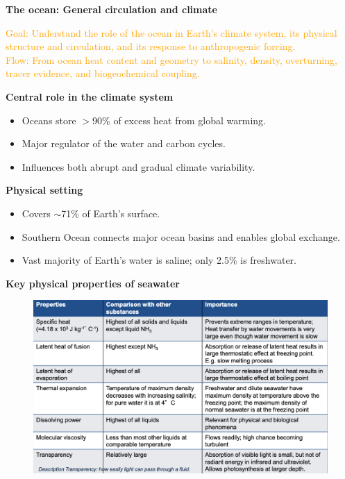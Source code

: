 \documentclass[fontsize=8pt, a4paper, landscape, fleqn]{scrartcl}
\renewcommand{\section}[1]{%
    \noindent\colorbox{sectioncolor}{%
        \parbox{\dimexpr\columnwidth-2\fboxsep}{\color{white}\textbf{#1}}}%
    \vspace{0.5mm}%
}
\renewcommand{\subsection}[1]{%
    \noindent\colorbox{subsectioncolor}{%
        \parbox{\dimexpr\columnwidth-2\fboxsep}{\color{white}\textbf{#1}}}%
    \vspace{0.5mm}%
}
\begin{document}
\begin{multicols*}{3}[\raggedcolumns]
\section{The ocean: General circulation and climate}
\noindent\textcolor{orange}{
Goal: Understand the role of the ocean in Earth's climate system, its physical structure and circulation, and its response to anthropogenic forcing.\\
Flow: From ocean heat content and geometry to salinity, density, overturning, tracer evidence, and biogeochemical coupling.
}

\subsection{Central role in the climate system}
\begin{itemize}
    \item Oceans store $>$90\% of excess heat from global warming.
    \item Major regulator of the water and carbon cycles.
    \item Influences both abrupt and gradual climate variability.
\end{itemize}

\subsection{Physical setting}
\begin{itemize}
    \item Covers $\sim$71\% of Earth's surface.
    \item Southern Ocean connects major ocean basins and enables global exchange.
    \item Vast majority of Earth’s water is saline; only 2.5\% is freshwater.
\end{itemize}

\subsection{Key physical properties of seawater}

\begin{figure}[H]
    \centering
    \includegraphics[width=0.9\linewidth]{CS/img/saltwater_table.png}
\end{figure}



\end{multicols*}
\end{document}
